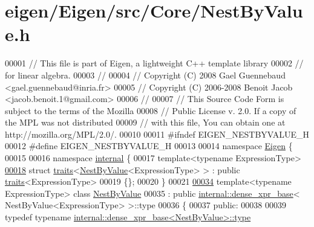 \hypertarget{eigen_2_eigen_2src_2_core_2_nest_by_value_8h_source}{}\section{eigen/\+Eigen/src/\+Core/\+Nest\+By\+Value.h}
\label{eigen_2_eigen_2src_2_core_2_nest_by_value_8h_source}

\begin{DoxyCode}
00001 \textcolor{comment}{// This file is part of Eigen, a lightweight C++ template library}
00002 \textcolor{comment}{// for linear algebra.}
00003 \textcolor{comment}{//}
00004 \textcolor{comment}{// Copyright (C) 2008 Gael Guennebaud <gael.guennebaud@inria.fr>}
00005 \textcolor{comment}{// Copyright (C) 2006-2008 Benoit Jacob <jacob.benoit.1@gmail.com>}
00006 \textcolor{comment}{//}
00007 \textcolor{comment}{// This Source Code Form is subject to the terms of the Mozilla}
00008 \textcolor{comment}{// Public License v. 2.0. If a copy of the MPL was not distributed}
00009 \textcolor{comment}{// with this file, You can obtain one at http://mozilla.org/MPL/2.0/.}
00010 
00011 \textcolor{preprocessor}{#ifndef EIGEN\_NESTBYVALUE\_H}
00012 \textcolor{preprocessor}{#define EIGEN\_NESTBYVALUE\_H}
00013 
00014 \textcolor{keyword}{namespace }\hyperlink{namespace_eigen}{Eigen} \{
00015 
00016 \textcolor{keyword}{namespace }\hyperlink{namespaceinternal}{internal} \{
00017 \textcolor{keyword}{template}<\textcolor{keyword}{typename} ExpressionType>
\hyperlink{struct_eigen_1_1internal_1_1traits_3_01_nest_by_value_3_01_expression_type_01_4_01_4}{00018} \textcolor{keyword}{struct }\hyperlink{struct_eigen_1_1internal_1_1traits}{traits}<\hyperlink{group___core___module_class_eigen_1_1_nest_by_value}{NestByValue}<ExpressionType> > : \textcolor{keyword}{public} \hyperlink{struct_eigen_1_1internal_1_1traits}{traits}<ExpressionType>
00019 \{\};
00020 \}
00021 
\hyperlink{group___core___module}{00034} \textcolor{keyword}{template}<\textcolor{keyword}{typename} ExpressionType> \textcolor{keyword}{class }\hyperlink{group___core___module_class_eigen_1_1_nest_by_value}{NestByValue}
00035   : \textcolor{keyword}{public} \hyperlink{struct_eigen_1_1internal_1_1dense__xpr__base}{internal::dense\_xpr\_base}< NestByValue<ExpressionType> >::type
00036 \{
00037   \textcolor{keyword}{public}:
00038 
00039     \textcolor{keyword}{typedef} \textcolor{keyword}{typename} \hyperlink{struct_eigen_1_1internal_1_1dense__xpr__base}{internal::dense\_xpr\_base<NestByValue>::type}

\end{DoxyCode}
